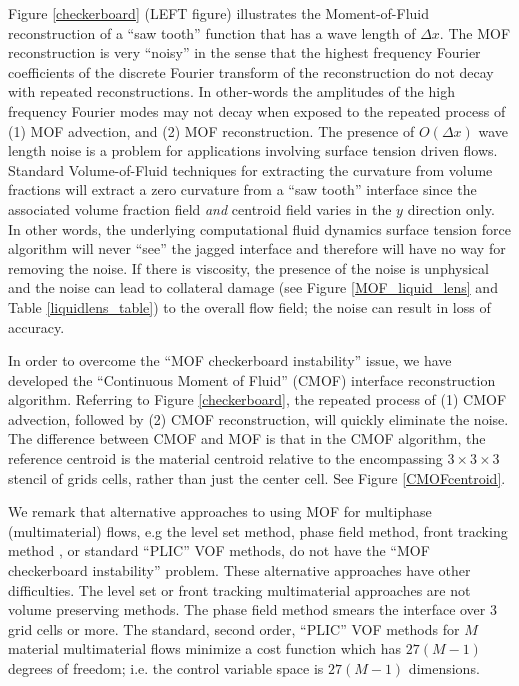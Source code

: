 \documentclass[]{article}
\begin{document}
Figure \ref{checkerboard} (LEFT figure) 
illustrates the 
Moment-of-Fluid\cite{dyadechko2005moment,ahn2007multi,ahn2009adaptive}
reconstruction of a ``saw tooth'' function that has a wave
length of $\Delta x$.  The MOF reconstruction is very ``noisy'' in the
sense that the highest frequency
Fourier coefficients of the discrete Fourier transform
of the reconstruction do not decay with repeated reconstructions.
In other-words the amplitudes of the high frequency Fourier modes may
not decay when exposed to the repeated process of
(1) MOF advection, and (2) MOF reconstruction.
The presence of $O(\Delta x)$ wave length noise is
a problem for applications involving  
surface tension driven flows.  Standard
Volume-of-Fluid techniques for extracting the curvature
from volume fractions\cite{sussman2003second,cummins2005estimating}
will extract a zero curvature from a ``saw tooth'' interface 
since the associated volume fraction field {\em and} centroid
field varies in the $y$
direction only.  In other words, the
underlying computational fluid dynamics surface tension force
algorithm will never ``see'' the jagged interface and therefore will have
no way for removing the noise.  If there is viscosity, the presence of the 
noise is unphysical and the noise can lead to collateral damage (see Figure 
\ref{MOF_liquid_lens} and Table \ref{liquidlens_table}) 
to the overall flow field; the noise can
result in loss of accuracy.

In order to overcome the ``MOF checkerboard instability'' issue, we have 
developed the ``Continuous Moment of Fluid'' (CMOF) interface reconstruction
algorithm\cite{VAHAB2021}.  
Referring to Figure \ref{checkerboard}, the repeated process
of (1) CMOF advection, followed by (2) CMOF reconstruction, 
will quickly eliminate the
noise.  The difference between CMOF and MOF is that in the CMOF algorithm,
the reference centroid is the material centroid relative to the 
encompassing $3\times 3\times 3$ stencil of grids cells, rather than just the
center cell.  See Figure \ref{CMOFcentroid}.   

We remark that alternative approaches to using MOF for multiphase 
(multimaterial)
flows, e.g the level set 
method\cite{smith2002projection,shetabivash2020multiple,starinshak2014new}, 
phase field method\cite{HUANG2022110795}, 
front tracking method \cite{vu2015numerical},
or standard ``PLIC'' VOF 
methods\cite{ancellin2022extension,schofield2008material,schofield2009second}, 
do not have the
``MOF checkerboard instability'' problem.  These alternative approaches
have other difficulties.  The level set or front tracking
multimaterial 
approaches\cite{smith2002projection,shetabivash2020multiple,starinshak2014new,vu2015numerical} 
are not volume preserving methods.  
The phase field method\cite{HUANG2022110795} 
smears the interface over 3 grid
cells or more.  The standard, second order, ``PLIC'' VOF methods for 
$M$ material multimaterial 
flows\cite{ancellin2022extension,schofield2008material,schofield2009second} 
minimize a cost function which has $27(M-1)$ 
degrees of freedom; i.e. the control variable space 
is $27(M-1)$ dimensions.
\end{document}
